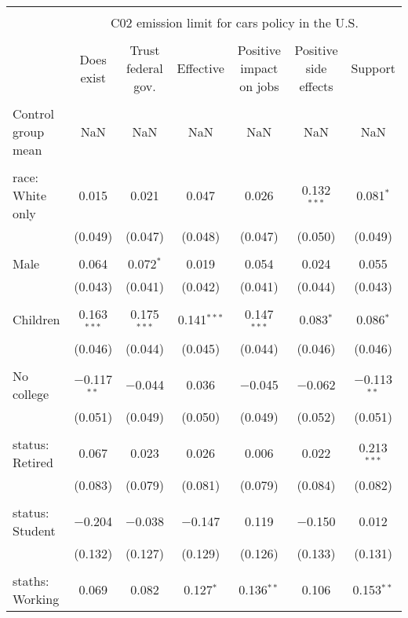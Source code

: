 
\begin{tabular}{@{\extracolsep{5pt}}lcccccc} 
\\[-1.8ex]\hline 
\hline \\[-1.8ex] 
 & \multicolumn{6}{c}{C02 emission limit for cars policy in the U.S.} \\ 
\cline{2-7} 
\\[-1.8ex] & Does exist & Trust federal gov. & Effective & Positive impact on jobs & Positive side effects & Support \\ 
\hline \\[-1.8ex] 
 Control group mean & NaN & NaN & NaN & NaN & NaN & NaN  \\ \hline \\[-1.8ex] race: White only & 0.015 & 0.021 & 0.047 & 0.026 & 0.132$^{***}$ & 0.081$^{*}$ \\ 
  & (0.049) & (0.047) & (0.048) & (0.047) & (0.050) & (0.049) \\ 
  & & & & & & \\ 
 Male & 0.064 & 0.072$^{*}$ & 0.019 & 0.054 & 0.024 & 0.055 \\ 
  & (0.043) & (0.041) & (0.042) & (0.041) & (0.044) & (0.043) \\ 
  & & & & & & \\ 
 Children & 0.163$^{***}$ & 0.175$^{***}$ & 0.141$^{***}$ & 0.147$^{***}$ & 0.083$^{*}$ & 0.086$^{*}$ \\ 
  & (0.046) & (0.044) & (0.045) & (0.044) & (0.046) & (0.046) \\ 
  & & & & & & \\ 
 No college & $-$0.117$^{**}$ & $-$0.044 & 0.036 & $-$0.045 & $-$0.062 & $-$0.113$^{**}$ \\ 
  & (0.051) & (0.049) & (0.050) & (0.049) & (0.052) & (0.051) \\ 
  & & & & & & \\ 
 status: Retired & 0.067 & 0.023 & 0.026 & 0.006 & 0.022 & 0.213$^{***}$ \\ 
  & (0.083) & (0.079) & (0.081) & (0.079) & (0.084) & (0.082) \\ 
  & & & & & & \\ 
 status: Student & $-$0.204 & $-$0.038 & $-$0.147 & 0.119 & $-$0.150 & 0.012 \\ 
  & (0.132) & (0.127) & (0.129) & (0.126) & (0.133) & (0.131) \\ 
  & & & & & & \\ 
 staths: Working & 0.069 & 0.082 & 0.127$^{*}$ & 0.136$^{**}$ & 0.106 & 0.153$^{**}$ \\ 

\end{tabular}
